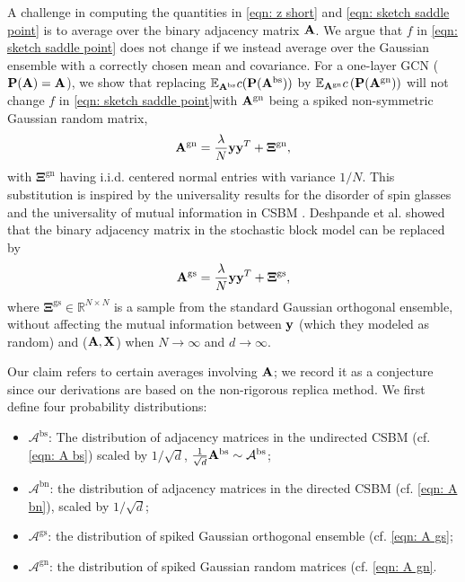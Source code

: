 \documentclass[9pt,twocolumn]{pnas-new}
\begin{document}
A challenge in computing the quantities in \eqref{eqn: z short} and \eqref{eqn: sketch saddle point} is to average over the binary adjacency matrix $\mathbf{A}$. We argue that $f$ in \eqref{eqn: sketch saddle point} does not change if we instead average over the Gaussian ensemble with a correctly chosen mean and covariance. For a one-layer GCN ($\mathbf{P}(\mathbf{A})=\mathbf{A}$), we show that replacing $\mathbb{E}_{\mathbf{A}^{\text{bs}}}c(\mathbf{P}({\mathbf{A}^{\text{bs}}}))$ by $\mathbb{E}_{\mathbf{A}^{\text{gn}}} c\left(\mathbf{P}({\mathbf{A}^{\text{gn}}})\right)$ will not change $f$ in \eqref{eqn: sketch saddle point}with $\mathbf{A}^{\text{gn}}$ being a spiked non-symmetric Gaussian random matrix,
\begin{equation}\label{eqn: A gn}
    \mathbf{A}^{\text{gn}}=\frac{\lambda}{N}\mathbf{y} \mathbf{y}^T+\boldsymbol{\Xi}^{\text{gn}},
\end{equation}
with $\boldsymbol{\Xi}^{\text{gn}}$ having i.i.d. centered normal entries with variance $1/N$. This substitution is inspired by the universality results for the disorder of spin glasses \cite{talagrand2002gaussian,carmona2006universality,panchenko2013sherrington} and the universality of mutual information in CSBM \cite{deshpande2018contextual}. Deshpande et al. \cite{deshpande2018contextual} showed that the binary adjacency matrix in the stochastic block model can be replaced by  
\begin{equation}\label{eqn: A gs}
    \mathbf{A}^{\text{gs}}=\frac{\lambda}{N}\mathbf{y}\mathbf{y}^T+\boldsymbol{\Xi}^{\text{gs}},
\end{equation}
where $\boldsymbol{\Xi}^{\text{gs}}\in\mathbb{R}^{N\times N}$ is a sample from the standard Gaussian orthogonal ensemble, without affecting the mutual information between $\mathbf{y}$ (which they modeled as random) and ($\mathbf{A}, \mathbf{X}$) when $N \to \infty$ and $d \to \infty$.

Our claim refers to certain averages involving $\mathbf{A}$; we record it as a conjecture since our derivations are based on the non-rigorous replica method. We first define four probability distributions:
\begin{itemize}
    \item $\mathcal{A}^{\mathrm{bs}}$: The distribution of adjacency matrices in the undirected CSBM (cf. \eqref{eqn: A bs}) scaled by $1/\sqrt{d}$, $\tfrac{1}{\sqrt{d}} \mathbf{A}^{\mathrm{bs}} \sim \mathcal{A}^{\mathrm{bs}}$;
    \item $\mathcal{A}^{\mathrm{bn}}$: the distribution of adjacency matrices in the directed CSBM (cf. \eqref{eqn: A bn}), scaled by $1/\sqrt{d}$;
    \item $\mathcal{A}^{\mathrm{gs}}$: the distribution of spiked Gaussian orthogonal ensemble (cf. \eqref{eqn: A gs};
    \item $\mathcal{A}^{\mathrm{gn}}$: the distribution of spiked Gaussian random matrices (cf. \eqref{eqn: A gn}.
\end{itemize}
\end{document}
